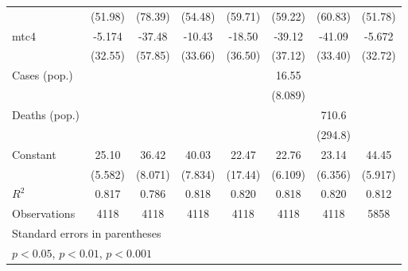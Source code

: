 \documentclass{article}
\begin{document}
{\begin{longtable}{l*{7}{c}}
                &  (51.98)         &  (78.39)         &  (54.48)         &  (59.71)         &  (59.22)         &  (60.83)         &  (51.78)         \\
mtc4            &   -5.174         &   -37.48         &   -10.43         &   -18.50         &   -39.12         &   -41.09         &   -5.672         \\
                &  (32.55)         &  (57.85)         &  (33.66)         &  (36.50)         &  (37.12)         &  (33.40)         &  (32.72)         \\
Cases (pop.)    &                  &                  &                  &                  &    16.55         &                  &                  \\
                &                  &                  &                  &                  &  (8.089)         &                  &                  \\
Deaths (pop.)   &                  &                  &                  &                  &                  &    710.6\sym{*}  &                  \\
                &                  &                  &                  &                  &                  &  (294.8)         &                  \\
Constant        &    25.10\sym{***}&    36.42\sym{***}&    40.03\sym{***}&    22.47         &    22.76\sym{***}&    23.14\sym{**} &    44.45\sym{***}\\
                &  (5.582)         &  (8.071)         &  (7.834)         &  (17.44)         &  (6.109)         &  (6.356)         &  (5.917)         \\
\hline
\(R^{2}\)       &    0.817         &    0.786         &    0.818         &    0.820         &    0.818         &    0.820         &    0.812         \\
Observations    &     4118         &     4118         &     4118         &     4118         &     4118         &     4118         &     5858         \\
\hline\hline
\multicolumn{8}{l}{\footnotesize Standard errors in parentheses}\\
\multicolumn{8}{l}{\footnotesize \sym{*} \(p<0.05\), \sym{**} \(p<0.01\), \sym{***} \(p<0.001\)}\\
\end{longtable}
}
\end{document}
